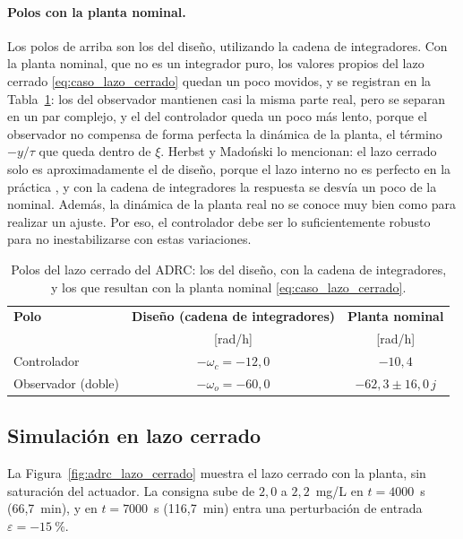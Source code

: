 \paragraph{Polos con la planta nominal.} Los polos de arriba son los del diseño, utilizando la cadena de integradores.
Con la planta nominal, que no es un integrador
puro, los valores propios del lazo cerrado \eqref{eq:caso_lazo_cerrado} quedan un poco movidos, y se registran en
la Tabla~\ref{tab:caso_polos}: los del observador mantienen casi la misma parte real, pero se separan
en un par complejo, y el del controlador queda un poco más lento, porque el observador no compensa de
forma perfecta la dinámica de la planta, el término $-y/\tau$ que queda dentro de
$\xi$. Herbst y Madoński lo mencionan: el lazo cerrado solo es aproximadamente el
de diseño, porque el lazo interno no es perfecto en la práctica
\cite[ec.~(2.34)]{herbst2024adrc}, y con la cadena de integradores la respuesta
se desvía un poco de la nominal. Además, la dinámica de la planta real no
se conoce muy bien como para realizar un ajuste. Por eso, el controlador debe ser lo suficientemente robusto para
no inestabilizarse con estas variaciones. 


\begin{table}[H]
\centering
\caption[Polos del lazo cerrado: diseño y planta nominal]{Polos del lazo cerrado
  del ADRC: los del diseño, con la cadena de integradores, y los que resultan con
  la planta nominal \eqref{eq:caso_lazo_cerrado}.}
\label{tab:caso_polos}
\renewcommand{\arraystretch}{1.3}
\begin{tabular}{lcc}
\toprule
\textbf{Polo} & \textbf{Diseño (cadena de integradores)} & \textbf{Planta nominal} \\
 & [rad/h] & [rad/h] \\
\midrule
Controlador & $-\omega_c = -12{,}0$ & $-10{,}4$ \\
Observador (doble) & $-\omega_o = -60{,}0$ & $-62{,}3 \pm 16{,}0\,j$ \\
\bottomrule
\end{tabular}
\end{table}

\subsection{Simulación en lazo cerrado}
\label{subsec:caso_simulacion}

La Figura~\ref{fig:adrc_lazo_cerrado} muestra el lazo cerrado con la planta,
sin saturación del actuador. La consigna
sube de $2{,}0$ a $2{,}2$~mg/L en $t = 4000$~s (66,7~min), y en $t = 7000$~s (116,7~min) entra una
perturbación de entrada $\varepsilon = -15~\%$.

